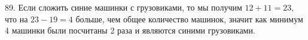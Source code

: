 89. Если сложить синие машинки с грузовиками, то мы получим $12+11=23,$ что на $23-19=4$ больше, чем общее количество машинок, значит как минимум 4 машинки были посчитаны 2 раза и являются синими грузовиками.\\
